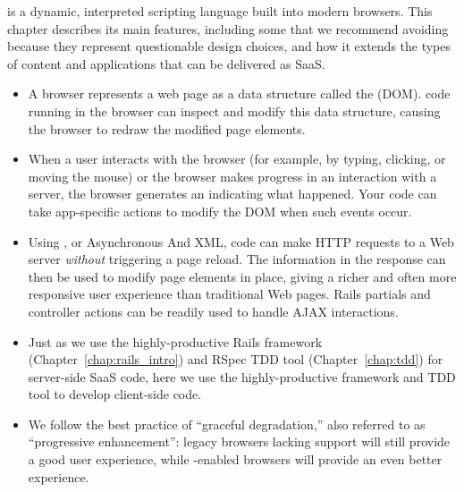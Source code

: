 \begin{concepts}

 is a dynamic, interpreted scripting language built into
modern browsers.
This chapter describes its main features, including some that we
recommend avoiding
because they represent questionable design choices, and how it extends
the types of content and applications that can be delivered as SaaS.

\begin{itemize}

\item A browser represents a web
page as a data structure called the  (DOM). \js{}
code running in the browser can inspect and modify this data
structure, causing the browser to redraw the modified page elements.

\item When a user interacts with the browser (for example, by
typing, clicking, or moving the mouse) or the browser makes progress
in an interaction with a server, the browser generates an
 indicating what happened.  Your
\js{} code can take app-specific actions to modify the DOM when such
events occur.

\item Using , or Asynchronous \js{} And XML,
\js{} code can make
HTTP requests to a Web server \emph{without} triggering a page
reload.  The information in the response can then be used to modify page
elements in place, giving a richer and often more responsive
user experience than traditional
Web pages.  Rails partials and controller actions
can be readily used to handle AJAX interactions.

\item Just as we use the highly-productive Rails framework
(Chapter~\ref{chap:rails_intro}) and RSpec
TDD tool (Chapter~\ref{chap:tdd}) for server-side SaaS code, here we use
the highly-productive  framework and
TDD tool to develop
client-side code.

\item We follow the best practice of ``graceful degradation,'' also
referred to as ``progressive enhancement'':
legacy browsers lacking \js{} support will still provide a good
user experience, while \js-enabled browsers will provide an even
better experience.

\end{itemize}

\end{concepts}
